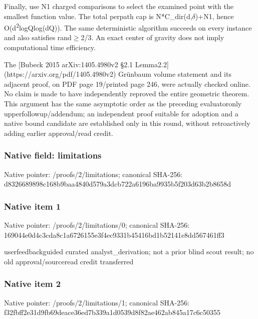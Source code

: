 \documentclass[10pt,a4paper]{article}
\begin{document}
Finally, use N1 charged comparisons to select the examined point with the smallest function value. The total perpath cap is N*C\_dir(d,\ensuremath{\delta})+N1, hence O(d\textsuperscript{2}logQlog(dQ)). The same deterministic algorithm succeeds on every instance and also satisfies rand\ensuremath{\ge}2/3. An exact center of gravity does not imply computational time efficiency.

The [Bubeck 2015 arXiv:1405.4980v2 §2.1 Lemma2.2](https://arxiv.\allowbreak{}org/pdf/1405.4980v2) Grünbaum volume statement and its adjacent proof, on PDF page 19/printed page 246, were actually checked online. No claim is made to have independently reproved the entire geometric theorem. This argument has the same asymptotic order as the preceding evaluatoronly upperfollowup/addendum; an independent proof suitable for adoption and a native bound candidate are established only in this round, without retroactively adding earlier approval/read credit.




\subsubsection{Native field: limitations}


Native pointer: /proofs/2/limitations; canonical SHA-256: d8326689898c168b9baa4840\allowbreak{}d579a3dcb722a6196ba9935b\allowbreak{}5f203d63b2b8658d



\subsubsection{Native item 1}


Native pointer: /proofs/2/limitations/0; canonical SHA-256: 169044e0d4c3cda8c1a67261\allowbreak{}55e3f4ec9331b45416bd1b52\allowbreak{}141e8dd567461ff3


userfeedbackguided curated analyst\_derivation; not a prior blind scout result; no old approval/sourceread credit transferred


\subsubsection{Native item 2}


Native pointer: /proofs/2/limitations/1; canonical SHA-256: f32fbff2e31d9fb69deace36\allowbreak{}ed7b339a1d0539d8f82ae462\allowbreak{}ab845a17c6c50355
\end{document}
